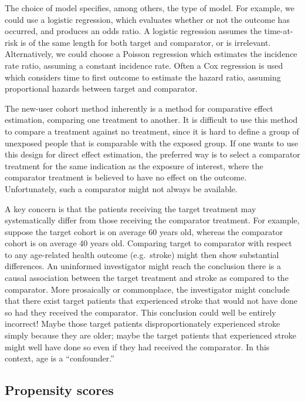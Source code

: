 \documentclass[11pt]{book}
\theoremstyle{definition}
\theoremstyle{definition}
\theoremstyle{definition}
\theoremstyle{remark}
\let\BeginKnitrBlock\begin \let\EndKnitrBlock\end
\begin{document}
The choice of model specifies, among others, the type of model. For example, we could use a logistic regression, which evaluates whether or not the outcome has occurred, and produces an odds ratio. A logistic regression assumes the time-at-risk is of the same length for both target and comparator, or is irrelevant. Alternatively, we could choose a Poisson regression which estimates the incidence rate ratio, assuming a constant incidence rate. Often a Cox regression is used which considers time to first outcome to estimate the hazard ratio, assuming proportional hazards between target and comparator.    

\BeginKnitrBlock{rmdimportant}
The new-user cohort method inherently is a method for comparative effect estimation, comparing one treatment to another. It is difficult to use this method to compare a treatment against no treatment, since it is hard to define a group of unexposed people that is comparable with the exposed group. If one wants to use this design for direct effect estimation, the preferred way is to select a comparator treatment for the same indication as the exposure of interest, where the comparator treatment is believed to have no effect on the outcome. Unfortunately, such a comparator might not always be available.
\EndKnitrBlock{rmdimportant}

A key concern is that the patients receiving the target treatment may systematically differ from those receiving the comparator treatment. For example, suppose the target cohort is on average 60 years old, whereas the comparator cohort is on average 40 years old. Comparing target to comparator with respect to any age-related health outcome (e.g.~stroke) might then show substantial differences. An uninformed investigator might reach the conclusion there is a causal association between the target treatment and stroke as compared to the comparator. More prosaically or commonplace, the investigator might conclude that there exist target patients that experienced stroke that would not have done so had they received the comparator. This conclusion could well be entirely incorrect! Maybe those target patients disproportionately experienced stroke simply because they are older; maybe the target patients that experienced stroke might well have done so even if they had received the comparator. In this context, age is a ``confounder.'' 

\hypertarget{propensity-scores}{%
\subsection{Propensity scores}\label{propensity-scores}}
\end{document}
